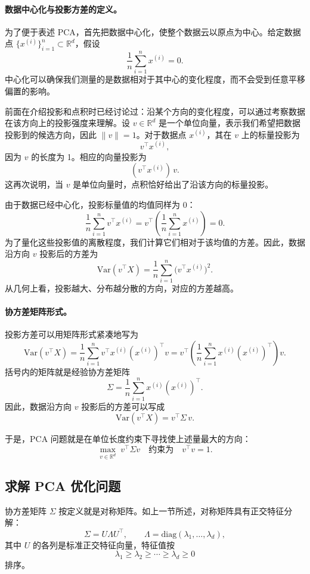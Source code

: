 \paragraph{数据中心化与投影方差的定义。}
为了便于表述 PCA，首先把数据中心化，使整个数据云以原点为中心。给定数据点 \(\{x^{(i)}\}_{i=1}^n \subset \mathbb{R}^d\)，假设
\[
\frac{1}{n}\sum_{i=1}^n x^{(i)} = 0.
\]
中心化可以确保我们测量的是数据相对于其中心的变化程度，而不会受到任意平移偏置的影响。

前面在介绍投影和点积时已经讨论过：沿某个方向的变化程度，可以通过考察数据在该方向上的投影强度来理解。设 \(v \in \mathbb{R}^d\) 是一个单位向量，表示我们希望把数据投影到的候选方向，因此 \(\|v\|=1\)。对于数据点 \(x^{(i)}\)，其在 \(v\) 上的标量投影为
\[
v^\top x^{(i)},
\]
因为 \(v\) 的长度为 1。相应的向量投影为
\[
(v^\top x^{(i)})\,v.
\]
这再次说明，当 \(v\) 是单位向量时，点积恰好给出了沿该方向的标量投影。

由于数据已经中心化，投影标量值的均值同样为 0：
\[
\frac{1}{n}\sum_{i=1}^n v^\top x^{(i)}
=
v^\top \left(\frac{1}{n}\sum_{i=1}^n x^{(i)}\right)
=
0.
\]
为了量化这些投影值的离散程度，我们计算它们相对于该均值的方差。因此，数据沿方向 \(v\) 投影后的方差为
\[
\mathrm{Var}(v^\top X)
=
\frac{1}{n}\sum_{i=1}^n \bigl(v^\top x^{(i)}\bigr)^2.
\]
从几何上看，投影越大、分布越分散的方向，对应的方差越高。

\paragraph{协方差矩阵形式。}
投影方差可以用矩阵形式紧凑地写为
\[
\mathrm{Var}(v^\top X)
=
\frac{1}{n}\sum_{i=1}^n v^\top x^{(i)} (x^{(i)})^\top v
=
v^\top \left( \frac{1}{n}\sum_{i=1}^n x^{(i)} (x^{(i)})^\top \right) v.
\]
括号内的矩阵就是经验协方差矩阵
\[
\Sigma = \frac{1}{n} \sum_{i=1}^n x^{(i)} (x^{(i)})^\top.
\]
因此，数据沿方向 \(v\) 投影后的方差可以写成
\[
\mathrm{Var}(v^\top X) = v^\top \Sigma\, v.
\]

于是，PCA 问题就是在单位长度约束下寻找使上述量最大的方向：
\[
\max_{v \in \mathbb{R}^d} \; v^\top \Sigma v
\quad \text{约束为} \quad v^\top v = 1.
\]

\subsection{求解 PCA 优化问题}

协方差矩阵 \(\Sigma\) 按定义就是对称矩阵。如上一节所述，对称矩阵具有正交特征分解：
\[
\Sigma = U \Lambda U^\top,
\qquad
\Lambda = \mathrm{diag}(\lambda_1,\ldots,\lambda_d),
\]
其中 \(U\) 的各列是标准正交特征向量，特征值按
\[
\lambda_1 \ge \lambda_2 \ge \cdots \ge \lambda_d \ge 0
\]
排序。

